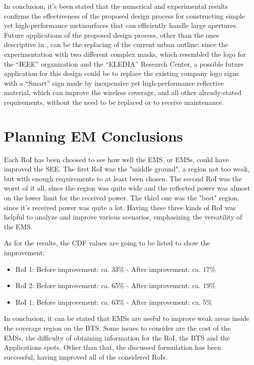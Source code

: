 In conclusion, it's been stated that the numerical and experimental
results confirms the effectiveness of the proposed design process
for constructing simple yet high-performance metasurfaces that can
efficiently handle large apertures. Future applications of the proposed
design process, other than the ones descriptive in \cite{Oliveri:2021},
can be the replacing of the current urban outline: since the experimentation
with two different complex masks, which resembled the logo for the
{}``IEEE'' organization and the {}``ELEDIA'' Research Center,
a possible future application for this design could be to replace
the existing company logo signs with a {}``Smart'' sign made by
inexpensive yet high-performance reflective material, which can improve
the wireless coverage, and all other already-stated requirements,
without the need to be replaced or to receive maintenance.

\section{Planning EM Conclusions}
Each RoI has been choosed to see how well the EMS, or EMSs, could
have improved the SEE. The first RoI was the "middle ground",
a region not too weak, but with enough requirements to at least been
chosen. The second RoI was the worst of it all, since the region was
quite wide and the reflected power was almost on the lower limit for
the received power. The third one was the "best"
region, since it's received power was quite a lot. Having these three
kinds of RoI was helpful to analyze and improve various scenarios,
emphasizing the versatility of the EMS. 

As for the results, the CDF values are going to be listed to show
the improvement:

\begin{itemize}
\item RoI 1: Before improvement: ca. 33\% - After improvement: ca. 17\%
\item RoI 2: Before improvement: ca. 65\% - After improvement: ca. 19\%
\item RoI 1: Before improvement: ca. 63\% - After improvement: ca. 5\%
\end{itemize}
In conclusion, it can be stated that EMSs are useful to improve weak
areas inside the coverage region on the BTS. Some issues to consider
are the cost of the EMSs, the difficulty of obtaining information
for the RoI, the BTS and the Applications spots. Other than that,
the discussed formulation has been successful, having improved all
of the considered RoIs. 

